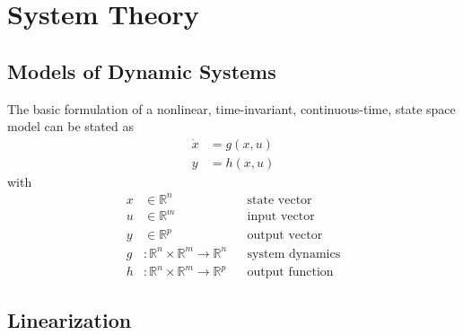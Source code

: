 \section{System Theory}

\subsection{Models of Dynamic Systems}

The basic formulation of a nonlinear, time-invariant, continuous-time, state space model can be stated as
\begin{align*}
    \dot{x} & = g(x,u) \\
    y       & = h(x,u)
\end{align*}
with
\begin{align*}
    x & \in \mathbb{R}^n                                    &  & \text{state vector}    \\
    u & \in \mathbb{R}^m                                    &  & \text{input vector}    \\
    y & \in \mathbb{R}^p                                    &  & \text{output vector}   \\
    g & : \mathbb{R}^n \times \mathbb{R}^m \to \mathbb{R}^n &  & \text{system dynamics} \\
    h & : \mathbb{R}^n \times \mathbb{R}^m \to \mathbb{R}^p &  & \text{output function}
\end{align*}


\subsection{Linearization}

